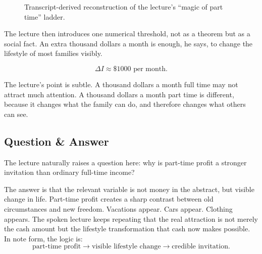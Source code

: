 \begin{figure}[h]
\centering
{}
\caption{Transcript-derived reconstruction of the lecture's ``magic of part time'' ladder.}
\end{figure}

The lecture then introduces one numerical threshold, not as a theorem but as a social fact. An extra thousand dollars a month is enough, he says, to change the lifestyle of most families visibly.

\begin{equation}
\Delta I \approx \$1000 \text{ per month.}
\end{equation}

The lecture's point is subtle. A thousand dollars a month full time may not attract much attention. A thousand dollars a month part time is different, because it changes what the family can do, and therefore changes what others can see.

\subsection{Question \& Answer}

The lecture naturally raises a question here: why is part-time profit a stronger invitation than ordinary full-time income?

The answer is that the relevant variable is not money in the abstract, but visible change in life. Part-time profit creates a sharp contrast between old circumstances and new freedom. Vacations appear. Cars appear. Clothing appears. The spoken lecture keeps repeating that the real attraction is not merely the cash amount but the lifestyle transformation that cash now makes possible. In note form, the logic is:
\[
\text{part-time profit} \longrightarrow \text{visible lifestyle change} \longrightarrow \text{credible invitation}.
\]

